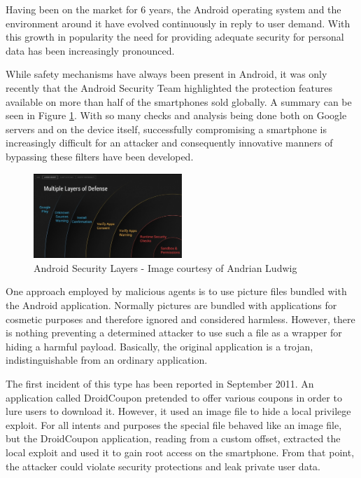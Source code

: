 
Having been on the market for 6 years, the Android operating system and the
environment around it have evolved continuously in reply to user demand. With
this growth in popularity the need for providing adequate security for
personal data has been increasingly pronounced.

While safety mechanisms have always been present in Android, it was only
recently\cite{android-layers} that the Android Security Team highlighted the
protection features available on more than half of the smartphones sold
globally. A summary can be seen in Figure \ref{fig:layers}. With so many
checks and analysis being done both on Google servers and on the device
itself, successfully compromising a smartphone is increasingly difficult for
an attacker and consequently innovative manners of bypassing these filters
have been developed.

\begin{figure}[hb]
  \centering
  \includegraphics[width=0.5\textwidth]{img/android-layers}
  \caption{Android Security Layers - Image courtesy of Andrian Ludwig}
  \label{fig:layers}
\end{figure}

One approach employed by malicious agents is to use picture files bundled with
the Android application. Normally pictures are bundled with applications for
cosmetic purposes and therefore ignored and considered harmless. However,
there is nothing preventing a determined attacker to use such a file as a
wrapper for hiding a harmful payload. Basically, the original application is a
trojan, indistinguishable from an ordinary application.

The first incident of this type has been reported in September
2011\cite{droid-coupon}. An application called DroidCoupon pretended to offer
various coupons in order to lure users to download it. However, it used an
image file to hide a local privilege exploit. For all intents and purposes the
special file behaved like an image file, but the DroidCoupon application,
reading from a custom offset, extracted the local exploit and used it to gain
root access on the smartphone. From that point, the attacker could violate
security protections and leak private user data.

